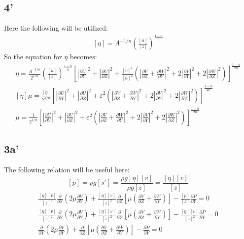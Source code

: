 \documentclass[10pt, letterpaper, twoside]{article}
\newcommand{\pd}[2]{\frac{\partial#1}{\partial#2}}
\begin{document}
	\subsection{4'}
	Here the following will be utilized:
	\begin{gather*}
		\left[\eta\right] = A^{-1/n}\left(\frac{\left[u\right]}{\left[z\right]}\right)^{\frac{1-n}{n}} \tag{S6}
	\end{gather*}
	So the equation for $ \eta $ becomes:
	\begin{gather*}
		\eta = \frac{A^{-1/n}}{2^{1/n}}\left(\frac{\left[u\right]}{\left[z\right]}\right)^{\frac{1-n}{n}}\left[\left|\pd{U}{Y}\right|^2 + \left|\pd{U}{Z}\right|^2 + \frac{\left[v\right]^2}{\left[u\right]^2}\left(\left|\pd{V}{Z} + \pd{W}{Y}\right|^2 + 2\left|\pd{V}{Y}\right|^2 + 2\left|\pd{W}{Z}\right|^2\right)\right]^{\frac{1-n}{2n}}\\
		\left[\eta\right]\mu = \frac{\left[\eta\right]}{2^{1/n}}\left[\left|\pd{U}{Y}\right|^2 + \left|\pd{U}{Z}\right|^2 + \varepsilon^2\left(\left|\pd{V}{Z} + \pd{W}{Y}\right|^2 + 2\left|\pd{V}{Y}\right|^2 + 2\left|\pd{W}{Z}\right|^2\right)\right]^{\frac{1-n}{2n}}\\
		\mu = \frac{1}{2^{1/n}}\left[\left|\pd{U}{Y}\right|^2 + \left|\pd{U}{Z}\right|^2 + \varepsilon^2\left(\left|\pd{V}{Z} + \pd{W}{Y}\right|^2 + 2\left|\pd{V}{Y}\right|^2 + 2\left|\pd{W}{Z}\right|^2\right)\right]^{\frac{1-n}{2n}} \tag{24}
	\end{gather*}
	\subsection{3a'}
	The following relation will be useful here:
	\begin{equation*}
		\left[p\right] = \rho g \left[s'\right] = \frac{\rho g \left[\eta\right]\left[v\right]}{\rho g \left[z\right]} = \frac{\left[\eta\right]\left[v\right]}{\left[z\right]} \tag{S7}
	\end{equation*}
	\begin{gather*}
		\frac{\left[\eta\right]\left[v\right]}{\left[z\right]^2}\pd{}{Y}\left(2\mu\pd{V}{Y}\right) + \frac{\left[\eta\right]\left[v\right]}{\left[z\right]^2}\pd{}{Z}\left[\mu\left(\pd{V}{Z}+\pd{W}{Y}\right)\right] - \frac{\left[p\right]}{\left[z\right]}\pd{P}{Y} = 0\\
		\frac{\left[\eta\right]\left[v\right]}{\left[z\right]^2}\pd{}{Y}\left(2\mu\pd{V}{Y}\right) + \frac{\left[\eta\right]\left[v\right]}{\left[z\right]^2}\pd{}{Z}\left[\mu\left(\pd{V}{Z}+\pd{W}{Y}\right)\right] - \frac{\left[\eta\right]\left[v\right]}{\left[z\right]^2}\pd{P}{Y} = 0\\
		\pd{}{Y}\left(2\mu\pd{V}{Y}\right) + \pd{}{Z}\left[\mu\left(\pd{V}{Z}+\pd{W}{Y}\right)\right] - \pd{P}{Y} = 0 \tag{23a}
	\end{gather*}
\end{document}
